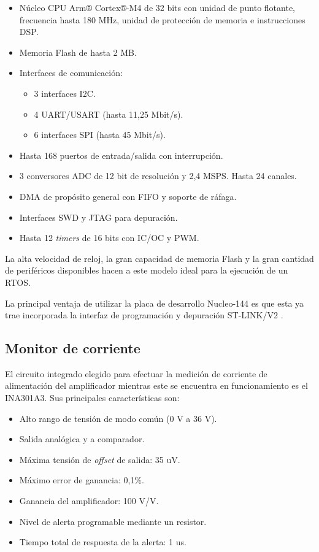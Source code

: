 \begin{itemize}
\item Núcleo CPU Arm® Cortex®-M4 de 32 bits con unidad de punto flotante, frecuencia hasta 180 MHz, unidad de protección de memoria e instrucciones DSP.
\item Memoria Flash de hasta 2 MB.
\item Interfaces de comunicación:
	\begin{itemize}
	\item 3 interfaces I2C.
	\item 4 UART/USART (hasta 11,25 Mbit/s).
	\item 6 interfaces SPI (hasta 45 Mbit/s).
	\end{itemize}
\item Hasta 168 puertos de entrada/salida con interrupción.
\item 3 conversores ADC de 12 bit de resolución y 2,4 MSPS. Hasta 24 canales.
\item DMA de propósito general con FIFO y soporte de ráfaga.
\item Interfaces SWD y JTAG para depuración.
\item Hasta 12 \textit{timers} de 16 bits con IC/OC y PWM.
\end{itemize}

La alta velocidad de reloj, la gran capacidad de memoria Flash y la gran cantidad de periféricos disponibles hacen a este modelo ideal para la ejecución de un RTOS.

La principal ventaja de utilizar la placa de desarrollo Nucleo-144 es que esta ya trae incorporada la interfaz de programación y depuración ST-LINK/V2 \citep{NUCLEO144}.

\subsection{Monitor de corriente}

El circuito integrado elegido para efectuar la medición de corriente de alimentación del amplificador mientras este se encuentra en funcionamiento es el INA301A3. Sus principales características son:

\begin{itemize}
\item Alto rango de tensión de modo común (0 V a 36 V).
\item Salida analógica y a comparador.
\item Máxima tensión de \textit{offset} de salida: 35 uV.
\item Máximo error de ganancia: 0,1\%.
\item Ganancia del amplificador: 100 V/V.
\item Nivel de alerta programable mediante un resistor.
\item Tiempo total de respuesta de la alerta: 1 us.
\end{itemize}

